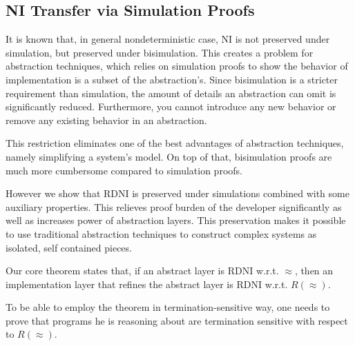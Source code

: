 \subsection{NI Transfer via Simulation Proofs}
It is known that, in general nondeterministic case, NI is not preserved under simulation, but preserved under bisimulation. This creates a problem for abstraction techniques, which relies on simulation proofs to show the behavior of implementation is a subset of the abstraction's. Since bisimulation is a stricter requirement than simulation, the amount of details an abstraction can omit is significantly reduced. Furthermore, you cannot introduce any new behavior or remove any existing behavior in an abstraction.

This restriction eliminates one of the best advantages of abstraction techniques, namely simplifying a system's model. On top of that, bisimulation proofs are much more cumbersome compared to simulation proofs. 

However we show that RDNI is preserved under simulations combined with some auxiliary properties. This relieves proof burden of the developer significantly as well as increases power of abstraction layers. This preservation makes it possible to use traditional abstraction techniques to construct complex systems as isolated, self contained pieces.

Our core theorem states that, if an abstract layer is RDNI w.r.t. $\approx$, then an implementation layer that refines the abstract layer is RDNI w.r.t. $R(\approx)$.  

To be able to employ the theorem in termination-sensitive way, one needs to prove that programs he is reasoning about are termination sensitive with respect to $R(\approx)$.
